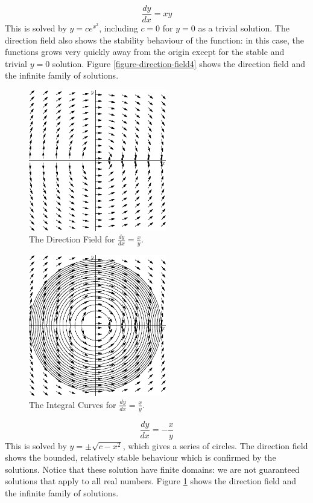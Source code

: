 \documentclass[fleqn,letterpaper]{report}
\begin{document}
\begin{example}
\begin{equation*}
\frac{dy}{dx} = xy
\end{equation*}
This is solved by $y = ce^{x^2}$, including $c=0$ for $y=0$ as
a trivial solution. The direction field also shows the
stability behaviour of the function: in this case, the
functions grows very quickly away from the origin except for
the stable and trivial $y=0$ solution.  Figure
\ref{figure-direction-field4} shows the direction field and the infinite
family of solutions.
\end{example}

\begin{figure}[t]
\centering
\includegraphics[width=6cm]{figure14.eps}
\caption{The Direction Field for $\frac{dy}{dx} = \frac{x}{y}$.}
\label{figure-direction-field5}
\end{figure}

\begin{figure}[t]
\centering
\includegraphics[width=6cm]{figure15.eps}
\caption{The Integral Curves for $\frac{dy}{dx} = \frac{x}{y}$.}
\label{figure-direction-field5-curves}
\end{figure}

\begin{example}
\begin{equation*}
\frac{dy}{dx} = -\frac{x}{y}
\end{equation*}
This is solved by $y = \pm \sqrt{c-x^2}$, which gives a series
of circles. The direction field shows the bounded, relatively
stable behaviour which is confirmed by the solutions. Notice
that these solution have finite domains: we are not guaranteed
solutions that apply to all real numbers. Figure
\ref{figure-direction-field5} shows the direction field and the infinite
family of solutions.
\end{example}
\end{document}
